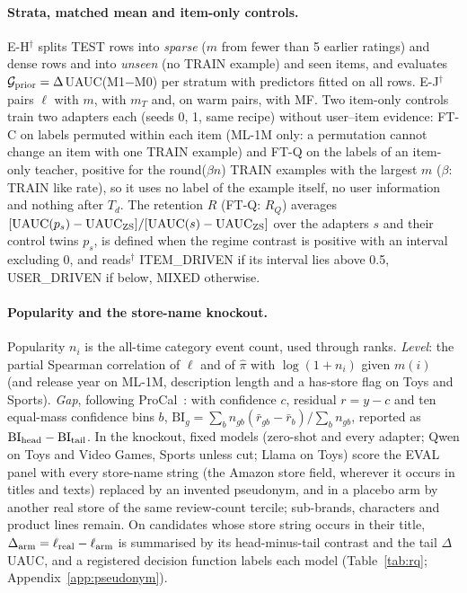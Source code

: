 \paragraph{Strata, matched mean and item-only controls.}
E-H$^\dagger$ splits TEST rows into \emph{sparse} ($m$ from fewer than 5 earlier ratings) and dense rows and into \emph{unseen} (no
TRAIN example) and seen items, and evaluates $\mathcal G_{\rm prior}=\Delta$UAUC(M1$-$M0) per stratum with predictors fitted on all
rows. E-J$^\dagger$ pairs $\ell$ with $m$, with $m_T$ and, on warm pairs, with MF. Two item-only controls train two adapters each
(seeds 0, 1, same recipe) without user--item evidence: FT-C on labels permuted within each item (ML-1M only: a permutation cannot
change an item with one TRAIN example) and FT-Q on the labels of an item-only teacher, positive for the round($\beta n$) TRAIN
examples with the largest $m$ ($\beta$: TRAIN like rate), so it uses no label of the example itself, no user information and nothing
after $T_d$. The retention $R$
(FT-Q: $R_Q$) averages $[\mathrm{UAUC}(p_s)-\mathrm{UAUC}_{\rm ZS}]/[\mathrm{UAUC}(s)-\mathrm{UAUC}_{\rm ZS}]$ over the adapters $s$
and their control twins $p_s$, is defined when the regime contrast is positive with an interval excluding 0, and reads$^\dagger$
ITEM\_DRIVEN if its interval lies above 0.5, USER\_DRIVEN if below, MIXED otherwise.

\paragraph{Popularity and the store-name knockout.}
Popularity $n_i$ is the all-time category event count, used through ranks. \emph{Level}: the partial Spearman correlation of $\ell$
and of $\hat\pi$ with $\log(1+n_i)$ given $m(i)$ (and release year on ML-1M, description length and a has-store flag on Toys and
Sports). \emph{Gap}, following ProCal~\citep{xiong2023procal}: with confidence $c$, residual $r=y-c$ and ten equal-mass confidence bins
$b$, $\mathrm{BI}_g=\sum_b n_{gb}(\bar r_{gb}-\bar r_b)/\sum_b n_{gb}$, reported as $\mathrm{BI}_{\rm head}-\mathrm{BI}_{\rm tail}$. In
the knockout, fixed models (zero-shot and every adapter; Qwen on Toys and Video Games, Sports unless cut; Llama on Toys) score the EVAL
panel with every store-name string (the Amazon store field, wherever it occurs in titles and texts) replaced by an invented pseudonym,
and in a placebo arm by another real store of the same review-count tercile; sub-brands, characters and product lines remain. On
candidates whose store string occurs in their title, $\Delta_{\rm arm}=\ell_{\rm real}-\ell_{\rm arm}$ is summarised by its
head-minus-tail contrast and the tail $\Delta$UAUC, and a registered decision function labels each model (Table~\ref{tab:rq};
Appendix~\ref{app:pseudonym}).


